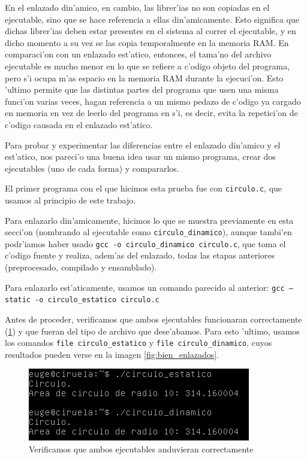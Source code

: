 \documentclass[11pt]{article}
\begin{document}
		En el enlazado din'amico, en cambio, las librer'ias no son copiadas en el ejecutable, sino que se hace referencia a ellas din'amicamente. Esto significa que dichas librer'ias deben estar presentes en el sistema al correr el ejecutable, y en dicho momento a su vez se las copia temporalmente en la memoria RAM. En comparaci'on con un enlazado est'atico, entonces, el tama'no del archivo ejecutable es mucho menor en lo que se refiere a c'odigo objeto del programa, pero s'i ocupa m'as espacio en la memoria RAM durante la ejecuci'on. Esto 'ultimo permite que las distintas partes del programa que usen una misma funci'on varias veces, hagan referencia a un mismo pedazo de c'odigo ya cargado en memoria en vez de leerlo del programa en s'i, es decir, evita la repetici'on de c'odigo causada en el enlazado est'atico.

		Para probar y experimentar las diferencias entre el enlazado din'amico y el est'atico, nos pareci'o una buena idea usar un mismo programa, crear dos ejecutables (uno de cada forma) y compararlos.

		El primer programa con el que hicimos esta prueba fue con \texttt{circulo.c}, que usamos al principio de este trabajo.

		Para enlazarlo din'amicamente, hicimos lo que se muestra previamente en esta secci'on (nombrando al ejecutable como \texttt{circulo\_dinamico}), aunque tambi'en podr'iamos haber usado \texttt{gcc -o circulo\_dinamico circulo.c}, que toma el c'odigo fuente y realiza, adem'as del enlazado, todas las etapas anteriores (preprocesado, compilado y ensamblado).

		Para enlazarlo est'aticamente, usamos un comando parecido al anterior: \texttt{gcc --static -o circulo\_estatico circulo.c}

		Antes de proceder, verificamos que ambos ejecutables funcionaran correctamente (\ref{fig:stat-dyn-prog2}) y que fueran del tipo de archivo que dese'abamos. Para esto 'ultimo, usamos los comandos \texttt{file circulo\_estatico} y \texttt{file circulo\_dinamico}, cuyos resultados pueden verse en la imagen \ref{fig:bien_enlazados}.

		\begin{figure}[H]
			\centering
   			\includegraphics{Images/Seccion 1/ambos_andan.png}
    		\caption{Verificamos que ambos ejecutables anduvieran correctamente}
    		\label{fig:stat-dyn-prog2}
		\end{figure}
\end{document}
